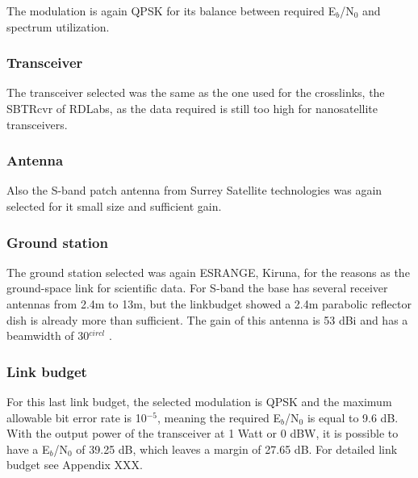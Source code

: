 The modulation is again QPSK for its balance between required E$_{b}$/N$_{0}$ and spectrum utilization.

\subsubsection{Transceiver}
The transceiver selected was the same as the one used for the crosslinks, the SBTRcvr of RDLabs, as the data required is still too high for nanosatellite transceivers.
\subsubsection{Antenna}
Also the S-band patch antenna from Surrey Satellite technologies was again selected for it small size and sufficient gain.
\subsubsection{Ground station}
The ground station selected was again ESRANGE, Kiruna, for the reasons as the ground-space link for scientific data. For S-band the base has several receiver antennas from 2.4m to 13m, but the linkbudget showed a 2.4m parabolic reflector dish is already more than sufficient. The gain of this antenna is 53 dBi and has a beamwidth of 30$^{circl}$ \cite{esrange}.

\subsubsection{Link budget}
For this last link budget, the selected modulation is QPSK and the maximum allowable bit error rate is 10$^{-5}$, meaning the required E$_{b}$/N$_{0}$ is equal to 9.6 dB. With the output power of the transceiver at 1 Watt or 0 dBW, it is possible to have a E$_{b}$/N$_{0}$ of 39.25 dB, which leaves a margin of 27.65 dB. For detailed link budget see Appendix XXX.

